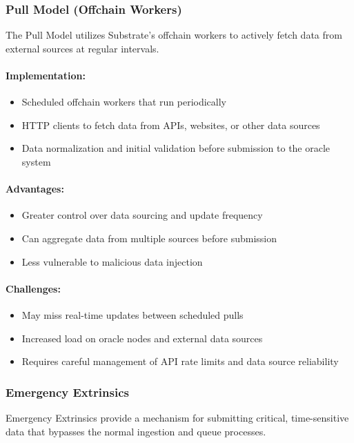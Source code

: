 \documentclass[12pt,a4paper]{article}
\begin{document}
	\subsubsection{Pull Model (Offchain Workers)}
	The Pull Model utilizes Substrate's offchain workers to actively fetch data from external sources at regular intervals.
	
	\paragraph{Implementation:}
	\begin{itemize}
		\item Scheduled offchain workers that run periodically
		\item HTTP clients to fetch data from APIs, websites, or other data sources
		\item Data normalization and initial validation before submission to the oracle system
	\end{itemize}
	
	\paragraph{Advantages:}
	\begin{itemize}
		\item Greater control over data sourcing and update frequency
		\item Can aggregate data from multiple sources before submission
		\item Less vulnerable to malicious data injection
	\end{itemize}
	
	\paragraph{Challenges:}
	\begin{itemize}
		\item May miss real-time updates between scheduled pulls
		\item Increased load on oracle nodes and external data sources
		\item Requires careful management of API rate limits and data source reliability
	\end{itemize}
	
	\subsubsection{Emergency Extrinsics}
	Emergency Extrinsics provide a mechanism for submitting critical, time-sensitive data that bypasses the normal ingestion and queue processes.
	
\end{document}
